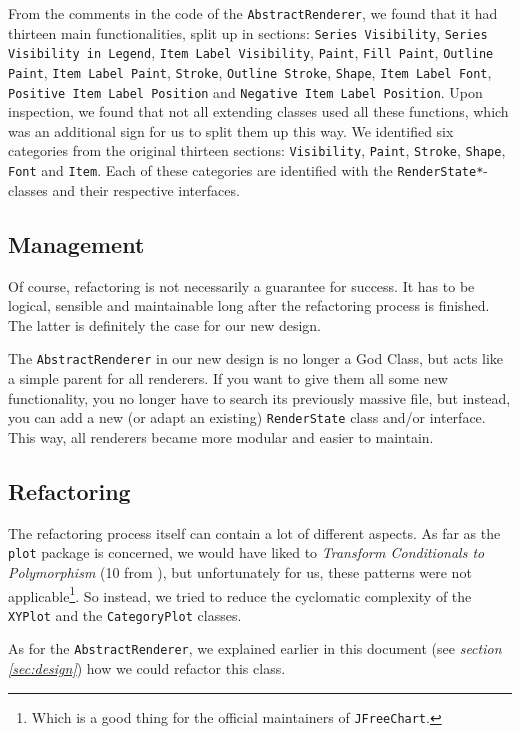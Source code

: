 \documentclass[11pt]{article}
\begin{document}
	From the comments in the code of the \texttt{AbstractRenderer}, we found that it had thirteen main functionalities, split up in sections: \texttt{Series Visibility}, \texttt{Series Visibility in Legend}, \texttt{Item Label Visibility}, \texttt{Paint}, \texttt{Fill Paint}, \texttt{Outline Paint}, \texttt{Item Label Paint}, \texttt{Stroke}, \texttt{Outline Stroke}, \texttt{Shape}, \texttt{Item Label Font}, \texttt{Positive Item Label Position} and \texttt{Negative Item Label Position}. Upon inspection, we found that not all extending classes used all these functions, which was an additional sign for us to split them up this way. We identified six categories from the original thirteen sections: \texttt{Visibility}, \texttt{Paint}, \texttt{Stroke}, \texttt{Shape}, \texttt{Font} and \texttt{Item}. Each of these categories are identified with the \texttt{RenderState*}-classes and their respective interfaces.
	
	\subsection{Management}
	Of course, refactoring is not necessarily a guarantee for success. It has to be logical, sensible and maintainable long after the refactoring process is finished. The latter is definitely the case for our new design.
	
	The \texttt{AbstractRenderer} in our new design is no longer a God Class, but acts like a simple parent for all renderers. If you want to give them all some new functionality, you no longer have to search its previously massive file, but instead, you can add a new (or adapt an existing) \texttt{RenderState} class and/or interface. This way, all renderers became more modular and easier to maintain.
	
	\subsection{Refactoring}
	The refactoring process itself can contain a lot of different aspects. As far as the \texttt{plot} package is concerned, we would have liked to \textsl{Transform Conditionals to Polymorphism} (10 from \cite{demeyer2009object}), but unfortunately for us, these patterns were not applicable\footnote{Which is a good thing for the official maintainers of \texttt{JFreeChart}.}. So instead, we tried to reduce the cyclomatic complexity of the \texttt{XYPlot} and the \texttt{CategoryPlot} classes.
	
	As for the \texttt{AbstractRenderer}, we explained earlier in this document (see \textsl{section \ref{sec:design}}) how we could refactor this class.
	
\end{document}
